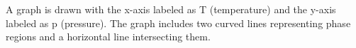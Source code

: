 A graph is drawn with the x-axis labeled as T (temperature) and the y-axis labeled as p (pressure). The graph includes two curved lines representing phase regions and a horizontal line intersecting them.